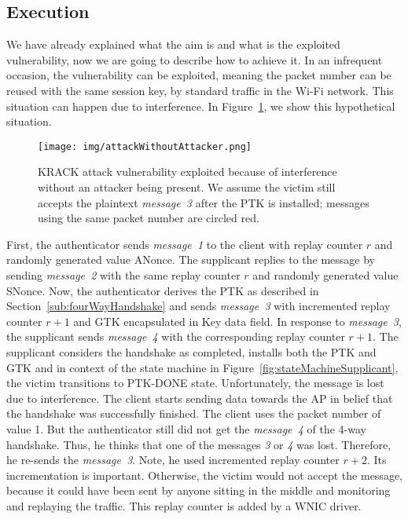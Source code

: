 \subsection{Execution}

We have already explained what the aim is and what is the exploited vulnerability, now we are going to describe how to achieve it. In an infrequent occasion, the vulnerability can be exploited, meaning the packet number can be reused with the same session key, by standard traffic in the Wi-Fi network. This situation can happen due to interference. In Figure~\ref{fig:attackWithoutAttacker}, we show this hypothetical situation.

\begin{figure}[h!]
  \centering
  \texttt{[image: img/attackWithoutAttacker.png]}
  \caption[KRACK attack vulnerability exploited because of interference]{KRACK attack vulnerability exploited because of interference without an attacker being present. We assume the victim still accepts the plaintext \textit{message~3} after the PTK is installed; messages using the same packet number are circled red.}
  \label{fig:attackWithoutAttacker}
\end{figure}

First, the authenticator sends \textit{message~1} to the client with replay counter $r$ and randomly generated value ANonce. The supplicant replies to the message by sending \textit{message~2} with the same replay counter $r$ and randomly generated value SNonce. Now, the authenticator derives the PTK as described in Section~\ref{sub:fourWayHandshake} and sends \textit{message~3} with incremented replay counter $r+1$ and GTK encapsulated in Key data field. In response to \textit{message~3}, the supplicant sends \textit{message~4} with the corresponding replay counter $r+1$. The supplicant considers the handshake as completed, installs both the PTK and GTK and in context of the state machine in Figure~\ref{fig:stateMachineSupplicant}, the victim transitions to PTK-DONE state. Unfortunately, the message is lost due to interference. The client starts sending data towards the AP in belief that the handshake was successfully finished. The client uses the packet number of value 1. But the authenticator still did not get the \textit{message~4} of the 4-way handshake. Thus, he thinks that one of the messages \textit{3} or \textit{4} was lost. Therefore, he re-sends the \textit{message~3}. Note, he used incremented replay counter $r+2$. Its incrementation is important. Otherwise, the victim would not accept the message, because it could have been sent by anyone sitting in the middle and monitoring and replaying the traffic. This replay counter is added by a WNIC driver.


